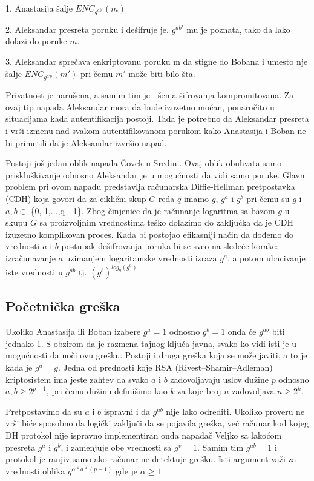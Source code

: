 \documentclass[a4paper]{article}
\begin{document}
1. Anastasija šalje $ENC_{g^{ab’}}(m)$

2. Aleksandar presreta poruku i dešifruje je. $g^{ab'}$ mu je poznata, tako da lako dolazi do poruke $m$.

3. Aleksandar sprečava enkriptovanu poruku m da stigne do Bobana i umesto nje šalje $ENC_{g^{a'b}}(m')$ pri čemu $m'$ može biti bilo šta. \cite{rb}

Privatnost je narušena, a samim tim je i šema šifrovanja kompromitovana. Za ovaj tip napada Aleksandar mora da bude izuzetno moćan, ponaročito u situacijama kada autentifikacija postoji. Tada je potrebno da Aleksandar presreta i vrši izmenu nad svakom autentifikovanom porukom kako Anastasija i Boban ne bi primetili da je Aleksandar izvršio napad.

Postoji još jedan oblik napada Čovek u Sredini. Ovaj oblik obuhvata samo priskluškivanje odnosno Aleksandar je u mogućnosti da vidi samo poruke. Glavni problem pri ovom napadu predstavlja računarska Diffie-Hellman pretpostavka (CDH) koja govori da za ciklični skup $G$ reda $q$ imamo $g$, $g^{a}$ i $g^{b}$ pri čemu su $g$ i $a, b\in$ \{0, 1,...,q - 1\}. Zbog činjenice da je računanje logaritma sa bazom $g$ u skupu $G$ sa proizvoljnim vrednostima teško dolazimo do zaključka da je CDH izuzetno komplikovan proces. Kada bi postojao efikasniji način da dođemo do vrednosti $a$ i $b$ postupak dešifrovanja poruka bi se sveo na sledeće korake: izračunavanje $a$ uzimanjem logaritamske vrednosti izraza $g^{a}$, a potom ubacivanje iste vrednosti u $g^{ab}$ tj. $(g^{b})^{log_g(g^{a})}$. \cite{dlproblem}
\subsection{Početnička greška}
Ukoliko Anastasija ili Boban izabere $g^{a}=1$ odnosno $g^{b}=1$ onda će $g^{ab}$ biti jednako 1. S obzirom da je razmena tajnog ključa javna, svako ko vidi isti je u mogućnosti da uoči ovu grešku. Postoji i druga greška koja se može javiti, a to je kada je $g^{a}=g$. Jedna od prednosti koje RSA (Rivest–Shamir–Adleman) kriptosistem ima jeste zahtev da svako $a$ i $b$ zadovoljavaju uslov dužine $p$ odnosno $a,b\geq2^{p-1}$, pri čemu dužinu definišimo kao $k$ za koje broj $n$ zadovoljava $n\geq2^{k}$. 

Pretpostavimo da su $a$ i $b$ ispravni i da $g^{ab}$ nije lako odrediti. Ukoliko proveru ne vrši biće sposobno da logički zaključi da se pojavila greška, već računar kod kojeg DH protokol nije ispravno implementiran onda napadač Veljko sa lakoćom presreta $g^{a}$ i $g^{b}$, i zamenjuje obe vrednosti sa $g^{v}=1$. Samim tim $g^{ab}=1$ i protokol je ranjiv samo ako računar ne detektuje grešku. Isti argument važi za vrednosti oblika $g^{\alpha*a*(p-1)}$ gde je $\alpha\geq1$
\end{document}
